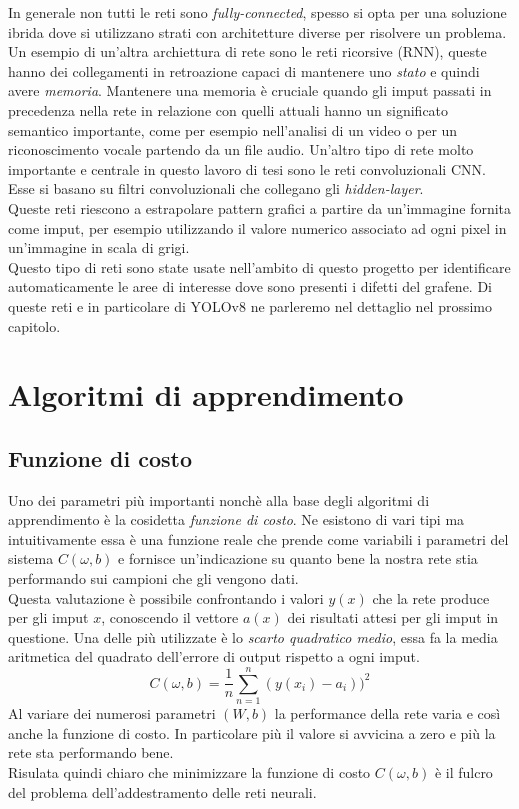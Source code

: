 \documentclass[12pt,a4paper,openright,twoside]{report}
\begin{document}
In generale non tutti le reti sono \emph{fully-connected}, spesso si opta per una soluzione ibrida dove si utilizzano strati con architetture diverse per risolvere un problema. 
Un esempio di un'altra archiettura di rete sono le reti ricorsive (RNN), queste hanno dei collegamenti in retroazione capaci di mantenere uno \emph{stato} e quindi avere \emph{memoria}. Mantenere una memoria è cruciale quando gli imput passati in precedenza nella rete in relazione con quelli attuali hanno un significato semantico importante, come per esempio nell'analisi di un video o per un riconoscimento vocale partendo da un file audio.
Un'altro tipo di rete molto importante e centrale in questo lavoro di tesi sono le reti convoluzionali CNN. Esse si basano su filtri convoluzionali che collegano gli \emph{hidden-layer}.\\ Queste reti riescono a estrapolare pattern grafici a partire da un'immagine fornita come imput, per esempio utilizzando il valore numerico associato ad ogni pixel in un'immagine in scala di grigi.\\
Questo tipo di reti sono state usate nell'ambito di questo progetto per identificare automaticamente le aree di interesse dove sono presenti i difetti del grafene. Di queste reti e in particolare di YOLOv8 ne parleremo nel dettaglio nel prossimo capitolo.

\newpage
\section{Algoritmi di apprendimento}
\subsection{Funzione di costo}
Uno dei parametri più importanti nonchè alla base degli algoritmi di apprendimento è la cosidetta \emph{funzione di costo}.
Ne esistono di vari tipi ma intuitivamente essa è una funzione reale che prende come variabili i parametri del sistema $C(\omega,b)$ e fornisce un'indicazione su quanto bene la nostra rete stia performando sui campioni che gli vengono dati.\\
Questa valutazione è possibile confrontando i valori $y(x)$ che la rete produce per gli imput $x$, conoscendo il vettore $a(x)$ dei risultati attesi per gli imput in questione.
Una delle più utilizzate è lo \emph{scarto quadratico medio}, essa fa la media aritmetica del quadrato dell'errore di output rispetto a ogni imput.
\begin{equation}
    C(\omega,b) = \frac{1}{n} \sum_{n=1}^{n} (y(x_{i}) - a_{i}))^2
\end{equation}
Al variare dei numerosi parametri $(W,b)$ la performance della rete varia e così anche la funzione di costo. In particolare più il valore si avvicina a zero e più la rete sta performando bene. \\
Risulata quindi chiaro che minimizzare la funzione di costo $C(\omega,b)$ è il fulcro del problema dell'addestramento delle reti neurali.
\end{document}
